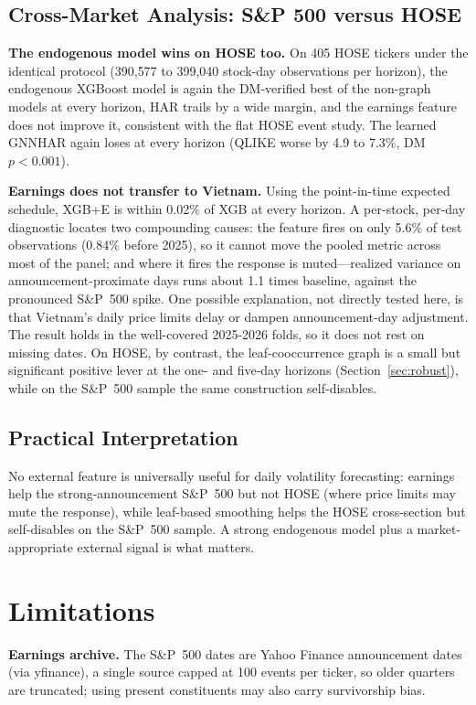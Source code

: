 \documentclass[runningheads,a4paper]{llncs}
\begin{document}
\subsection{Cross-Market Analysis: S\&P 500 versus HOSE}\label{sec:hose}
\textbf{The endogenous model wins on HOSE too.} On 405 HOSE tickers under the identical protocol
(390{,}577 to 399{,}040 stock-day observations per horizon), the endogenous XGBoost model is again the
DM-verified best of the non-graph models at every horizon, HAR trails by a wide margin, and the earnings
feature does not improve it, consistent with the flat HOSE event study. The learned GNNHAR again loses at
every horizon (QLIKE worse by 4.9 to 7.3\%, DM $p<0.001$).

\textbf{Earnings does not transfer to Vietnam.} Using the point-in-time expected schedule, XGB+E is within
0.02\% of XGB at every horizon. A per-stock, per-day diagnostic locates two compounding causes: the feature
fires on only 5.6\% of test observations (0.84\% before 2025), so it cannot move the pooled metric across
most of the panel; and where it fires the response is muted---realized variance on announcement-proximate
days runs about 1.1 times baseline, against the pronounced S\&P~500 spike. One possible explanation, not
directly tested here, is that Vietnam's daily price limits delay or dampen announcement-day adjustment. The
result holds in the well-covered 2025-2026
folds, so it does not rest on missing dates. On HOSE, by contrast, the leaf-cooccurrence graph is a small
but significant positive lever at the one- and five-day horizons (Section~\ref{sec:robust}), while on the
S\&P~500 sample the same construction self-disables.

\subsection{Practical Interpretation}
No external feature is universally useful for daily volatility forecasting: earnings help the
strong-announcement S\&P~500 but not HOSE (where price limits may mute the response), while
leaf-based smoothing helps the HOSE cross-section but self-disables on the S\&P~500 sample. A strong
endogenous model plus a market-appropriate external signal is what matters.

\FloatBarrier
\section{Limitations}
\noindent\textbf{Earnings archive.} The S\&P~500 dates are Yahoo Finance announcement dates (via
yfinance), a single source capped at 100 events per ticker, so older quarters are truncated; using present
constituents may also carry survivorship bias.
\end{document}
